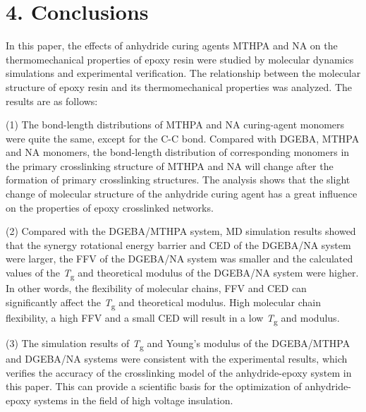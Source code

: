 \documentclass{article}
\begin{document}
\section*{4. Conclusions}

In this paper, the effects of anhydride curing agents MTHPA and NA on the thermomechanical properties of epoxy resin were studied by molecular dynamics simulations and experimental verification. The relationship between the molecular structure of epoxy resin and its thermomechanical properties was analyzed. The results are as follows:

(1) The bond-length distributions of MTHPA and NA curing-agent monomers were quite the same, except for the C-C bond. Compared with DGEBA, MTHPA and NA monomers, the bond-length distribution of corresponding monomers in the primary crosslinking structure of MTHPA and NA will change after the formation of primary crosslinking structures. The analysis shows that the slight change of molecular structure of the anhydride curing agent has a great influence on the properties of epoxy crosslinked networks.

(2) Compared with the DGEBA/MTHPA system, MD simulation results showed that the synergy rotational energy barrier and CED of the DGEBA/NA system were larger, the FFV of the DGEBA/NA system was smaller and the calculated values of the \emph{T}\textsubscript{g} and theoretical modulus of the DGEBA/NA system were higher. In other words, the flexibility of molecular chains, FFV and CED can significantly affect the \emph{T}\textsubscript{g} and theoretical modulus. High molecular chain flexibility, a high FFV and a small CED will result in a low \emph{T}\textsubscript{g} and modulus.

(3) The simulation results of \emph{T}\textsubscript{g} and Young’s modulus of the DGEBA/MTHPA and DGEBA/NA systems were consistent with the experimental results, which verifies the accuracy of the crosslinking model of the anhydride-epoxy system in this paper. This can provide a scientific basis for the optimization of anhydride-epoxy systems in the field of high voltage insulation.

\medskip
{}

\end{document}
